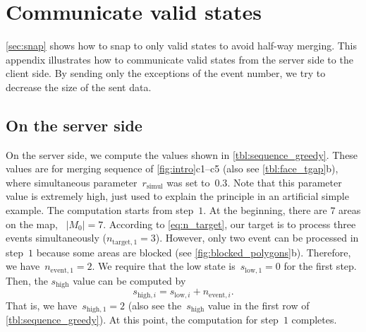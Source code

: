 \documentclass[twocolumn]{svjour3}          %
\begin{document}
\bigskip


\section{Communicate valid states}
\label{appx:communicate_valid_states}

\sect\ref{sec:snap} shows how to snap to only valid states 
to avoid half-way merging.
This appendix illustrates how to communicate valid states 
from the server side to the client side.
By sending only the exceptions of the event number, 
we try to decrease the size of the sent data.



\subsection{On the server side}
\label{sec:communicate_server}

On the server side, 
we compute the values shown in \tabl\ref{tbl:sequence_greedy}.
These values are for merging sequence of \fig\ref{fig:intro}c1--c5
(also see \tabl\ref{tbl:face_tgap}b),
where simultaneous parameter~$r_\mathrm{simul}$ was set to~$0.3$.
Note that this parameter value is extremely high, 
just used to explain the principle in an artificial simple example.
The computation starts from step~$1$.
At the beginning, there are $7$ areas on the map, \ie~$|M_0| = 7$.
According to \eq\ref{eq:n_target},
our target is to process three events simultaneously 
($n_{\mathrm{target},1} = 3$).
However, only two event can be processed in step~$1$ 
because some areas are blocked
(see \fig\ref{fig:blocked_polygons}b).
Therefore, we have~$n_{\mathrm{event},1} = 2$.
We require that the low state is~$s_{\mathrm{low},1} = 0$ for the first step.
Then, the $s_\mathrm{high}$ value can be computed by
\begin{equation}
\label{eq:state_high}
s_{\mathrm{high},i} = s_{\mathrm{low},i} + n_{\mathrm{event},i}.
\end{equation}
That is, we have~$s_{\mathrm{high},1}=2$
(also see the~$s_\mathrm{high}$ value in the first row of \tabl\ref{tbl:sequence_greedy}).
At this point, the computation for step~$1$ completes.
\end{document}
